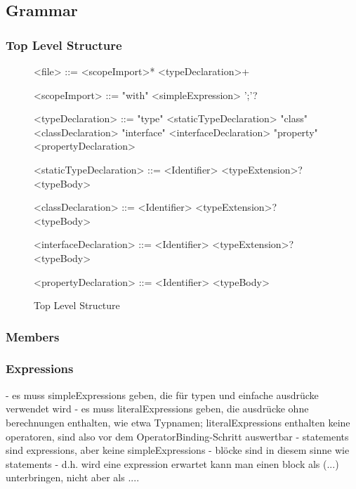 \subsection{Grammar}

\subsubsection{Top Level Structure}

\begin{figure}
	\begin{grammar}
		<file> ::= <scopeImport>* <typeDeclaration>+
		
		<scopeImport> ::= "with" <simpleExpression> ';'?
		
		<typeDeclaration> ::= "type" <staticTypeDeclaration>
		\alt "class" <classDeclaration>
		\alt "interface" <interfaceDeclaration>
		\alt "property" <propertyDeclaration>
		
		<staticTypeDeclaration> ::= <Identifier> <typeExtension>? <typeBody>
		
		<classDeclaration> ::= <Identifier> <typeExtension>? <typeBody>
		
		<interfaceDeclaration> ::= <Identifier> <typeExtension>? <typeBody>
		
		<propertyDeclaration> ::= <Identifier> <typeBody>
	\end{grammar}
	\caption{Top Level Structure}
	\label{fig:syn:top:level}
\end{figure}


\subsubsection{Members}

\subsubsection{Expressions}

- es muss simpleExpressions geben, die für typen und einfache ausdrücke verwendet wird
- es muss literalExpressions geben, die ausdrücke ohne berechnungen enthalten, wie etwa Typnamen; literalExpressions enthalten keine operatoren, sind also vor dem OperatorBinding-Schritt auswertbar
- statements sind expressions, aber keine simpleExpressions
- blöcke sind in diesem sinne wie statements
- d.h. wird eine expression erwartet kann man einen block als ({...}) unterbringen, nicht aber als {...}.

